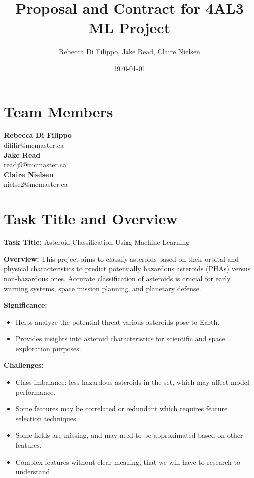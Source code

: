 \documentclass{article}
\title{Proposal and Contract for 4AL3 ML Project}
\author{Rebecca Di Filippo, Jake Read, Claire Nielsen}
\date{\today}
\begin{document}
\maketitle

\newpage
\section{Team Members}

\textbf{Rebecca Di Filippo}\\
difilir@mcmaster.ca\\

\textbf{Jake Read}\\
readj9@mcmaster.ca\\

\textbf{Claire Nielsen}\\
nielsc2@mcmaster.ca\\

\section{Task Title and Overview}
\textbf{Task Title:} Asteroid Classification Using Machine Learning \newline

\textbf{Overview:} 
This project aims to classify asteroids based on their orbital and physical characteristics to predict potentially hazardous asteroids (PHAs) versus non-hazardous ones. 
Accurate classification of asteroids is crucial for early warning systems, space mission planning, and planetary defense. \newline

\textbf{Significance:}
\begin{itemize}
    \item Helps analyze the potential threat various asteroids pose to Earth.
    \item Provides insights into asteroid characteristics for scientific and space exploration purposes.
\end{itemize}

\textbf{Challenges:}
\begin{itemize}
    \item Class imbalance: less hazardous asteroids in the set, which may affect model performance.
    \item Some features may be correlated or redundant which requires feature selection techniques.
    \item Some fields are missing, and may need to be approximated based on other features.
    \item Complex features without clear meaning, that we will have to research to understand.
\end{itemize}
\end{document}
